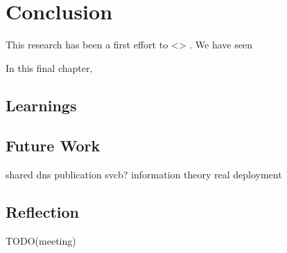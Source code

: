 \chapter{Conclusion}\label{Conclusion}

This research has been a first effort to <> . We have seen 

In this final chapter,
\blindtext









\section{Learnings}

\blindtext









\section{Future Work}

shared dns publication
svcb?
information theory
real deployment
\blindtext








\section{Reflection}

TODO(meeting)
\blindtext
